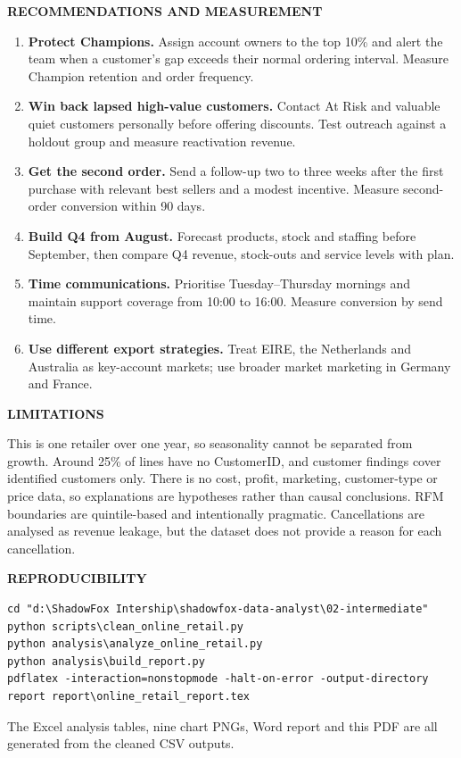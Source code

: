 \documentclass[11pt,a4paper]{article}
\newcommand{\kicker}[1]{{\sffamily\bfseries\small\color{teal}\MakeUppercase{#1}}}
\newcommand{\sect}[1]{\needspace{5\baselineskip}\vspace{0.5em}\par\kicker{#1}\par\vspace{-0.5em}{\color{rule}\rule{\linewidth}{0.5pt}}\par\vspace{-0.2em}}
\begin{document}
\sect{Recommendations and measurement}
\begin{enumerate}[leftmargin=1.5em,itemsep=2pt]
\item \textbf{Protect Champions.} Assign account owners to the top 10\% and
alert the team when a customer's gap exceeds their normal ordering interval.
Measure Champion retention and order frequency.
\item \textbf{Win back lapsed high-value customers.} Contact At Risk and
valuable quiet customers personally before offering discounts. Test outreach
against a holdout group and measure reactivation revenue.
\item \textbf{Get the second order.} Send a follow-up two to three weeks after
the first purchase with relevant best sellers and a modest incentive. Measure
second-order conversion within 90 days.
\item \textbf{Build Q4 from August.} Forecast products, stock and staffing
before September, then compare Q4 revenue, stock-outs and service levels with
plan.
\item \textbf{Time communications.} Prioritise Tuesday--Thursday mornings and
maintain support coverage from 10:00 to 16:00. Measure conversion by send time.
\item \textbf{Use different export strategies.} Treat EIRE, the Netherlands and
Australia as key-account markets; use broader market marketing in Germany and
France.
\end{enumerate}

\sect{Limitations}
This is one retailer over one year, so seasonality cannot be separated from
growth. Around 25\% of lines have no CustomerID, and customer findings cover
identified customers only. There is no cost, profit, marketing, customer-type
or price data, so explanations are hypotheses rather than causal conclusions.
RFM boundaries are quintile-based and intentionally pragmatic. Cancellations
are analysed as revenue leakage, but the dataset does not provide a reason for
each cancellation.

\sect{Reproducibility}
\begin{lstlisting}
cd "d:\ShadowFox Intership\shadowfox-data-analyst\02-intermediate"
python scripts\clean_online_retail.py
python analysis\analyze_online_retail.py
python analysis\build_report.py
pdflatex -interaction=nonstopmode -halt-on-error -output-directory report report\online_retail_report.tex
\end{lstlisting}
The Excel analysis tables, nine chart PNGs, Word report and this PDF are all
generated from the cleaned CSV outputs.
\end{document}

